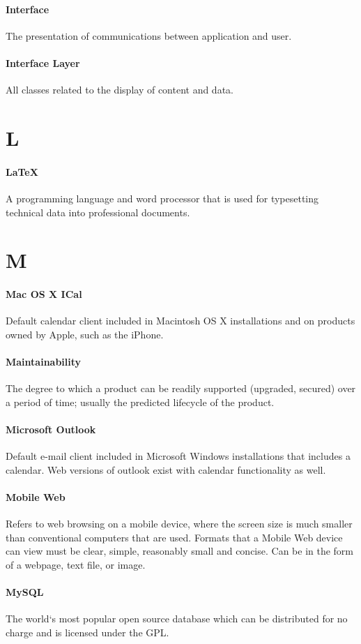 \documentclass[letterpaper,12pt]{report}
\begin{document}
\paragraph{Interface} The presentation of communications between application and user.
\paragraph{Interface Layer} All classes related to the display of content and data.
\section*{L}
\paragraph{LaTeX} A programming language and word processor that is used for typesetting technical data into professional documents.
\section*{M}
\paragraph{Mac OS X ICal} Default calendar client included in Macintosh OS X installations and on products owned by Apple, such as the iPhone.
\paragraph{Maintainability} The degree to which a product can be readily supported (upgraded, secured) over a period of time; usually the predicted lifecycle of the product.
\paragraph{Microsoft Outlook} Default e-mail client included in Microsoft Windows installations that includes a calendar. Web versions of outlook exist with calendar functionality as well.
\paragraph{Mobile Web} Refers to web browsing on a mobile device, where the screen size is much smaller than conventional computers that are used. Formats that a Mobile Web device can view must be clear, simple, reasonably small and concise. Can be in the form of a webpage, text file, or image.
\paragraph{MySQL} The world`s most popular open source database which can be distributed for no charge and is licensed under the GPL.
\end{document}
